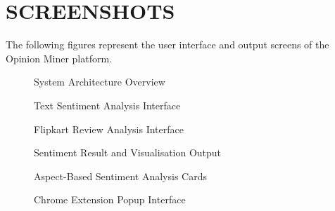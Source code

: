 \documentclass[12pt,a4paper]{report}
\begin{document}
\section{SCREENSHOTS}

The following figures represent the user interface and output screens of the Opinion Miner platform.

\begin{figure}[H]
\centering
{}
\caption{System Architecture Overview}
\label{fig:arch}
\end{figure}

\begin{figure}[H]
\centering
{}
\caption{Text Sentiment Analysis Interface}
\label{fig:textui}
\end{figure}

\begin{figure}[H]
\centering
{}
\caption{Flipkart Review Analysis Interface}
\label{fig:urlui}
\end{figure}

\begin{figure}[H]
\centering
{}
\caption{Sentiment Result and Visualisation Output}
\label{fig:results}
\end{figure}

\begin{figure}[H]
\centering
{}
\caption{Aspect-Based Sentiment Analysis Cards}
\label{fig:aspects}
\end{figure}

\begin{figure}[H]
\centering
{}
\caption{Chrome Extension Popup Interface}
\label{fig:extension}
\end{figure}
\end{document}
